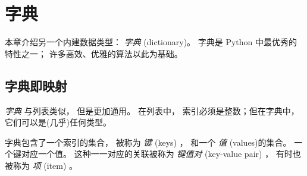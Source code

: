 

\chapter{字典}


本章介绍另一个内建数据类型： {\em 字典} (dictionary)。
字典是 Python 中最优秀的特性之一； 许多高效、优雅的算法以此为基础。

\section{字典即映射}

  
  
  


{\em 字典} 与列表类似， 但是更加通用。
在列表中， 索引必须是整数；但在字典中， 它们可以是(几乎)任何类型。


字典包含了一个索引的集合， 被称为 {\em 键} (keys) ， 和一个 {\em 值} (values)的集合。   一个键对应一个值。   这种一一对应的关联被称为 {\em 键值对} (key-value pair) ，  有时也被称为 {\em 项} (item) 。


